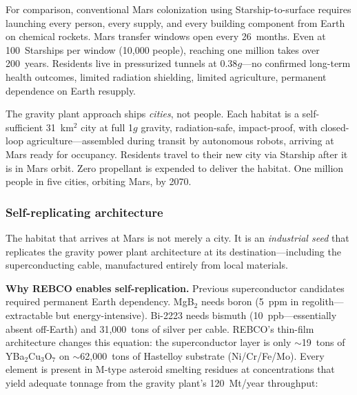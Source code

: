 \documentclass[12pt,letterpaper]{article}
\begin{document}
For comparison, conventional Mars colonization using Starship-to-surface requires launching every person, every supply, and every building component from Earth on chemical rockets. Mars transfer windows open every 26~months. Even at 100~Starships per window (10,000 people), reaching one million takes over 200~years. Residents live in pressurized tunnels at 0.38$g$---no confirmed long-term health outcomes, limited radiation shielding, limited agriculture, permanent dependence on Earth resupply.

The gravity plant approach ships \emph{cities}, not people. Each habitat is a self-sufficient 31~km$^2$ city at full 1$g$ gravity, radiation-safe, impact-proof, with closed-loop agriculture---assembled during transit by autonomous robots, arriving at Mars ready for occupancy. Residents travel to their new city via Starship after it is in Mars orbit. Zero propellant is expended to deliver the habitat. One million people in five cities, orbiting Mars, by 2070.

\subsubsection{Self-replicating architecture}\label{sec:selfrep}

The habitat that arrives at Mars is not merely a city. It is an \emph{industrial seed} that replicates the gravity power plant architecture at its destination---including the superconducting cable, manufactured entirely from local materials.

\textbf{Why REBCO enables self-replication.} Previous superconductor candidates required permanent Earth dependency. MgB$_2$ needs boron (5~ppm in regolith---extractable but energy-intensive). Bi-2223 needs bismuth (10~ppb---essentially absent off-Earth) and 31{,}000~tons of silver per cable. REBCO's thin-film architecture changes this equation: the superconductor layer is only ${\sim}$19~tons of YBa$_2$Cu$_3$O$_7$ on ${\sim}$62{,}000~tons of Hastelloy substrate (Ni/Cr/Fe/Mo). Every element is present in M-type asteroid smelting residues at concentrations that yield adequate tonnage from the gravity plant's 120~Mt/year throughput:
\end{document}
